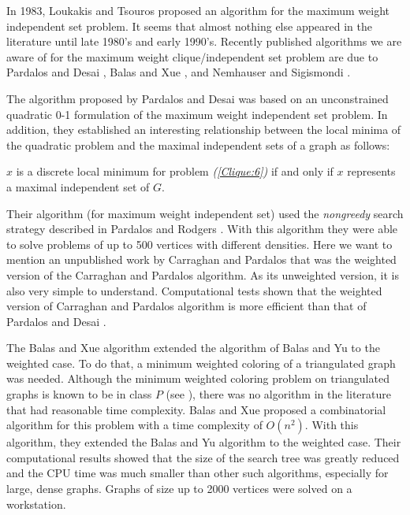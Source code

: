 In 1983, Loukakis and Tsouros \cite{LoTs83} proposed an algorithm
for the maximum weight independent set problem.
It seems that almost nothing else appeared in the literature
until late 1980's and early 1990's.  Recently
published algorithms we are aware of for the maximum weight
clique/independent set problem are due to Pardalos and Desai
\cite{PaDe91}, Balas and Xue \cite{BaXu91}, and Nemhauser and
Sigismondi \cite{NeSi92}.

The algorithm proposed by Pardalos and Desai \cite{PaDe91} was based
on an unconstrained quadratic 0-1 formulation of the maximum weight
independent set problem. In addition,
they established an interesting relationship between
the local minima of the quadratic problem and the maximal
independent sets of a graph as follows:
\begin{thm}
$x$ is a discrete local minimum for problem {\em (\ref{Clique:6})}
if and only if $x$ represents a maximal independent set of $G$.
	\label{thm5.1}
\end{thm}
Their algorithm (for maximum weight independent set) used the {\em
nongreedy} search strategy described in Pardalos and Rodgers
\cite{PaRo92}. With this algorithm they were able to solve problems of up to 500
vertices with different densities. Here we want to mention an
unpublished work by Carraghan and Pardalos that was the weighted
version of the Carraghan and Pardalos \cite{CaPa90.2} algorithm. As
its unweighted version, it is also very simple to understand.
Computational tests shown that the weighted version of Carraghan and
Pardalos algorithm is more efficient than that of Pardalos and Desai
\cite{PaDe91}.

The Balas and Xue \cite{BaXu91} algorithm extended the algorithm of
Balas and Yu \cite{BaYu86} to the weighted case. To do that, a
minimum weighted coloring of a triangulated graph was needed.
Although the minimum weighted coloring problem on triangulated
graphs is known to be in class $P$ (see \cite{Gol80}), there was no
algorithm in the literature that had reasonable time complexity.
Balas and Xue \cite{BaXu91} proposed a combinatorial algorithm
for this problem with a time complexity of $O(n^{2})$. With this
algorithm, they extended the Balas and Yu algorithm to the weighted
case. Their computational results showed that the size of the search
tree was greatly reduced and the CPU time was much smaller than
other such algorithms, especially for large, dense graphs. Graphs of
size up to 2000 vertices were solved on a workstation.

